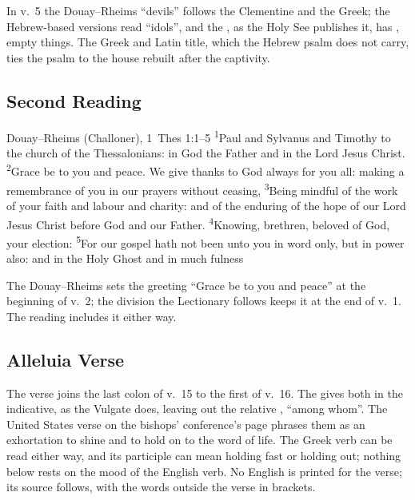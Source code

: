 \noindent In v.~5 the Douay--Rheims ``devils'' follows the Clementine
 and the Greek; the Hebrew-based versions read ``idols'', and
the , as the Holy See publishes it, has ,
empty things. The Greek and Latin
title, which the Hebrew psalm does not carry, ties the psalm to the house
rebuilt after the captivity.

\subsection{Second Reading}
\label{proper-second-reading}


\begin{englishwitness}{Douay--Rheims (Challoner), 1~Thes 1:1--5}
\textsuperscript{1}Paul and Sylvanus and Timothy to the church of the
Thessalonians: in God the Father and in the Lord Jesus Christ.
\textsuperscript{2}Grace be to you and peace. We give thanks to God always for
you all: making a remembrance of you in our prayers without ceasing,
\textsuperscript{3}Being mindful of the work of your faith and labour and
charity: and of the enduring of the hope of our Lord Jesus Christ before God
and our Father. \textsuperscript{4}Knowing, brethren, beloved of God, your
election: \textsuperscript{5}For our gospel hath not been unto you in word
only, but in power also: and in the Holy Ghost and in much fulness
\end{englishwitness}

\noindent The Douay--Rheims sets the greeting ``Grace be to you and peace'' at
the beginning of v.~2; the division the Lectionary follows keeps it at the end
of v.~1. The reading includes it either way.

\subsection{Alleluia Verse}
\label{proper-acclamation}


\noindent The verse joins the last colon of v.~15 to the first of v.~16. The
 gives both in the indicative, as the Vulgate does, leaving out the
relative , ``among whom''. The United States verse on the
bishops' conference's page phrases them as an exhortation to shine and to hold
on to the word of life. The Greek verb can be read either way, and its
participle can mean holding fast or holding out; nothing below rests on the
mood of the English verb. No English is printed for the verse; its source
follows, with the words outside the verse in brackets.

